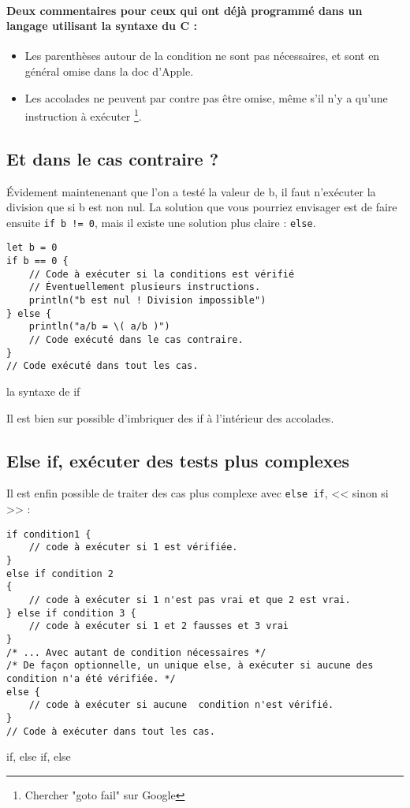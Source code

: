 \paragraph{Deux commentaires pour ceux qui ont déjà programmé
dans un langage utilisant la syntaxe du C :}
\begin{itemize}
\item Les parenthèses autour de la condition ne sont pas nécessaires,
et sont en général omise dans la doc d'Apple.
\item Les accolades ne peuvent par contre pas être omise,
même s'il n'y a qu'une instruction à exécuter
\footnote{Chercher "goto fail" sur Google}.
\end{itemize}
\subsection{Et dans le cas contraire ?}
Évidement maintenenant que l'on  a testé la valeur de b, il faut n'exécuter la division que si b est non nul.
La solution que vous pourriez envisager est de faire ensuite
\texttt{if b != 0},
mais il existe une solution plus claire : \texttt{else}.
\begin{listing}[h]
\begin{verbatim}
let b = 0
if b == 0 {
    // Code à exécuter si la conditions est vérifié
    // Éventuellement plusieurs instructions.
    println("b est nul ! Division impossible")
} else {
    println("a/b = \( a/b )")
    // Code exécuté dans le cas contraire.
}
// Code exécuté dans tout les cas.
\end{verbatim}
\caption{la syntaxe de if}
\end{listing} %

Il est bien sur possible d'imbriquer des if à l'intérieur des accolades.
\subsection{Else if, exécuter des tests plus complexes}
Il est enfin possible de traiter des cas plus complexe avec \texttt{else if}, << sinon si >> :

\begin{listing}[h]
\begin{verbatim}
if condition1 {
    // code à exécuter si 1 est vérifiée.
}
else if condition 2
{
    // code à exécuter si 1 n'est pas vrai et que 2 est vrai.
} else if condition 3 {
    // code à exécuter si 1 et 2 fausses et 3 vrai 
}
/* ... Avec autant de condition nécessaires */
/* De façon optionnelle, un unique else, à exécuter si aucune des condition n'a été vérifiée. */
else {
    // code à exécuter si aucune  condition n'est vérifié.
}
// Code à exécuter dans tout les cas.
\end{verbatim}
\caption{if, else if, else}
\end{listing}
